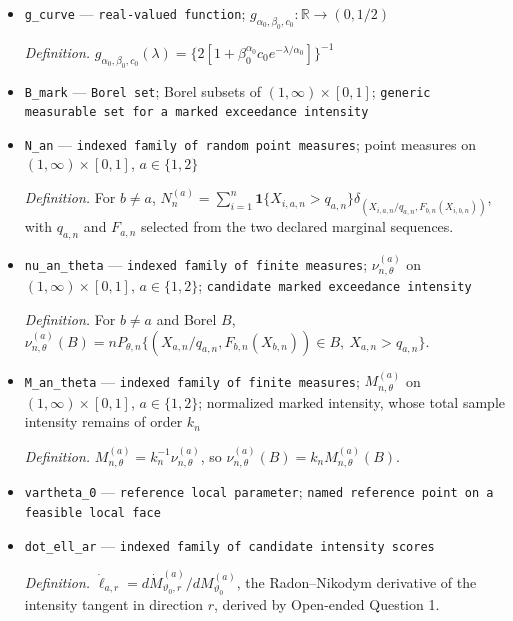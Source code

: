 \documentclass{article}
\begin{document}
\begin{itemize}
  \item \texttt{g\_\allowbreak{}curve} --- \texttt{real-\allowbreak{}valued function}; \(g_{\alpha_0,\beta_0,c_0}:\mathbb R\to(0,1/2)\)
  \par\smallskip\noindent\emph{Definition.} \(g_{\alpha_0,\beta_0,c_0}(\lambda)=\{2[1+\beta_0^{\alpha_0}c_0e^{-\lambda/\alpha_0}]\}^{-1}\)
  \item \texttt{B\_\allowbreak{}mark} --- \texttt{Borel set}; Borel subsets of \((1,\infty)\times[0,1]\); \texttt{generic measurable set for a marked exceedance intensity}
  \item \texttt{N\_\allowbreak{}an} --- \texttt{indexed family of random point measures}; point measures on \((1,\infty)\times[0,1]\), \(a\in\{1,2\}\)
  \par\smallskip\noindent\emph{Definition.} For \(b\neq a\), \(N_n^{(a)}=\sum_{i=1}^n\mathbf 1\{X_{i,a,n}>q_{a,n}\}\delta_{(X_{i,a,n}/q_{a,n},F_{b,n}(X_{i,b,n}))}\), with \(q_{a,n}\) and \(F_{a,n}\) selected from the two declared marginal sequences.
  \item \texttt{nu\_\allowbreak{}an\_\allowbreak{}theta} --- \texttt{indexed family of finite measures}; \(\nu_{n,\theta}^{(a)}\) on \((1,\infty)\times[0,1]\), \(a\in\{1,2\}\); \texttt{candidate marked exceedance intensity}
  \par\smallskip\noindent\emph{Definition.} For \(b\neq a\) and Borel \(B\), \(\nu_{n,\theta}^{(a)}(B)=nP_{\theta,n}\{(X_{a,n}/q_{a,n},F_{b,n}(X_{b,n}))\in B,\ X_{a,n}>q_{a,n}\}\).
  \item \texttt{M\_\allowbreak{}an\_\allowbreak{}theta} --- \texttt{indexed family of finite measures}; \(M_{n,\theta}^{(a)}\) on \((1,\infty)\times[0,1]\), \(a\in\{1,2\}\); normalized marked intensity, whose total sample intensity remains of order \(k_n\)
  \par\smallskip\noindent\emph{Definition.} \(M_{n,\theta}^{(a)}=k_n^{-1}\nu_{n,\theta}^{(a)}\), so \(\nu_{n,\theta}^{(a)}(B)=k_nM_{n,\theta}^{(a)}(B)\).
  \item \texttt{vartheta\_\allowbreak{}0} --- \texttt{reference local parameter}; \texttt{named reference point on a feasible local face}
  \item \texttt{dot\_\allowbreak{}ell\_\allowbreak{}ar} --- \texttt{indexed family of candidate intensity scores}
  \par\smallskip\noindent\emph{Definition.} \(\dot\ell_{a,r}=d\dot M_{\vartheta_0,r}^{(a)}/dM_{\vartheta_0}^{(a)}\), the Radon--Nikodym derivative of the intensity tangent in direction \(r\), derived by Open-ended Question 1.

\end{itemize}
\end{document}
